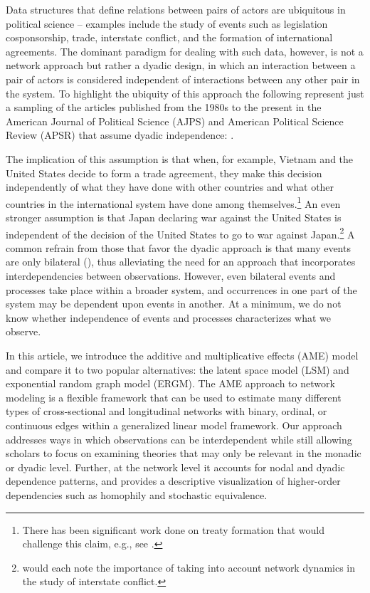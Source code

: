 Data structures that define relations between pairs of actors are ubiquitous in political science -- examples include the study of events such as legislation cosponsorship, trade, interstate conflict, and the formation of international agreements. The dominant paradigm for dealing with such data, however, is not a network approach but rather a dyadic design, in which an interaction between a pair of actors is considered independent of interactions between any other pair in the system. To highlight the ubiquity of this approach the following represent just a sampling of the articles published from the 1980s to the present in the American Journal of Political Science (AJPS) and American Political Science Review (APSR) that assume dyadic independence: \citet{dixon:1983,mansfield:etal:2000,lemke:reed:2001a,mitchell:2002,dafoe:2011a,fuhrmann:sechser:2014,carnegie:2014}.

The implication of this assumption is that when, for example, Vietnam and the United States decide to form a trade agreement, they make this decision independently of what they have done with other countries and what other countries in the international system have done among themselves.\footnote{There has been significant work done on treaty formation that would challenge this claim, e.g., see \citet{manger:etal:2012,kinne:2013}.} An even stronger assumption is that Japan declaring war against the United States is independent of the decision of the United States to go to war against Japan.\footnote{\citet{maoz:etal:2006,minhas:etal:2016} would each note the importance of taking into account network dynamics in the study of interstate conflict.} A common refrain from those that favor the dyadic approach is that many events are only bilateral (\citealt{diehl:wright:2016}), thus alleviating the need for an approach that incorporates interdependencies between observations. However, even bilateral events and processes take place within a broader system, and occurrences in one part of the system may be dependent upon events in another. At a minimum, we do not know whether independence of events and processes characterizes what we observe. 

In this article, we introduce the additive and multiplicative effects (AME) model and compare it to two popular alternatives: the latent space model (LSM) and exponential random graph model (ERGM). The AME approach to network modeling is a flexible framework that can be used to estimate many different types of cross-sectional and longitudinal networks with binary, ordinal, or continuous edges within a generalized linear model framework. Our approach addresses ways in which observations can be interdependent while still allowing scholars to focus on examining theories that may only be relevant in the monadic or dyadic level. Further, at the network level it accounts for nodal and dyadic dependence patterns, and provides a descriptive visualization of higher-order dependencies such as homophily and stochastic equivalence. 

